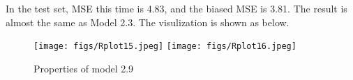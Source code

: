 In the test set, MSE this time is 4.83, and the biased MSE is 3.81. The result is almost the same as Model 2.3. The visulization is shown as below.
\newpage
\begin{figure}[!htbp]
\centering 
        \texttt{[image: figs/Rplot15.jpeg]}
        \texttt{[image: figs/Rplot16.jpeg]} \\
\caption[Properties of model 2.9]{Properties of model 2.9}
\label{fig:example} 
\end{figure}







